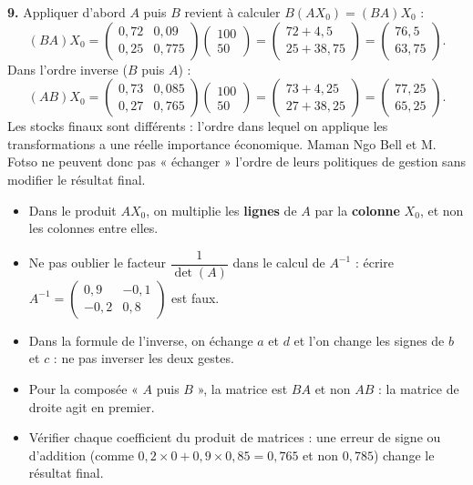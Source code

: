 \documentclass[11pt]{article}
\begin{document}
\begin{exoresolu}
\textbf{9.} Appliquer d'abord $A$ puis $B$ revient à calculer $B(AX_0) = (BA)X_0$ :
\[
(BA) X_0 = \begin{pmatrix} 0,72 & 0,09 \\ 0,25 & 0,775 \end{pmatrix} \begin{pmatrix} 100 \\ 50 \end{pmatrix}
= \begin{pmatrix} 72 + 4,5 \\ 25 + 38,75 \end{pmatrix} = \begin{pmatrix} 76,5 \\ 63,75 \end{pmatrix}.
\]
Dans l'ordre inverse ($B$ puis $A$) :
\[
(AB) X_0 = \begin{pmatrix} 0,73 & 0,085 \\ 0,27 & 0,765 \end{pmatrix} \begin{pmatrix} 100 \\ 50 \end{pmatrix}
= \begin{pmatrix} 73 + 4,25 \\ 27 + 38,25 \end{pmatrix} = \begin{pmatrix} 77,25 \\ 65,25 \end{pmatrix}.
\]
Les stocks finaux sont différents : l'ordre dans lequel on applique les transformations a une réelle importance économique. Maman Ngo Bell et M. Fotso ne peuvent donc pas « échanger » l'ordre de leurs politiques de gestion sans modifier le résultat final.
\end{exoresolu}

\begin{attention}
\begin{itemize}
\item Dans le produit $A X_0$, on multiplie les \textbf{lignes} de $A$ par la \textbf{colonne} $X_0$, et non les colonnes entre elles.
\item Ne pas oublier le facteur $\dfrac{1}{\det(A)}$ dans le calcul de $A^{-1}$ : écrire $A^{-1} = \begin{pmatrix} 0,9 & -0,1 \\ -0,2 & 0,8 \end{pmatrix}$ est faux.
\item Dans la formule de l'inverse, on échange $a$ et $d$ et l'on change les signes de $b$ et $c$ : ne pas inverser les deux gestes.
\item Pour la composée « $A$ puis $B$ », la matrice est $BA$ et non $AB$ : la matrice de droite agit en premier.
\item Vérifier chaque coefficient du produit de matrices : une erreur de signe ou d'addition (comme $0,2\times0 + 0,9\times0,85 = 0,765$ et non $0,785$) change le résultat final.
\end{itemize}
\end{attention}
\end{document}
